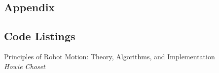 \documentclass[11pt, a4paper]{article}
\begin{document}

\newpage
\begin{appendices}
\section*{Appendix}
\subsection{Code Listings}

\end{appendices}


\begin{thebibliography}{1}

Principles of Robot Motion: Theory, Algorithms, and Implementation\\
\textit{Howie Choset}

\end{thebibliography}
\end{document}
